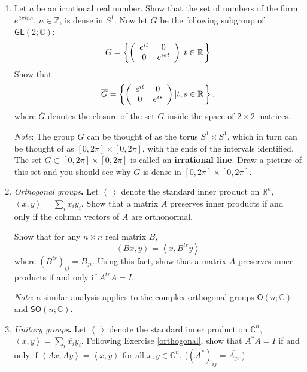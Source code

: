 \documentclass[12pt]{amsbook}
\theoremstyle{plain}
\numberwithin{equation}{chapter}
\numberwithin{theorem}{chapter}
\begin{document}
\begin{enumerate}
\item \label{not.closed}Let $a$ be an irrational real number. Show that the
set of numbers of the form $e^{2\pi ina}$, $n\in\mathbb{Z}$, is dense in
$S^{1}$. Now let $G$ be the following subgroup of $\mathsf{GL}(2;\mathbb{C}%
)$:
\[
G=\left\{  \left(
\begin{array}
[c]{cc}%
e^{it} & 0\\
0 & e^{iat}%
\end{array}
\right)  \left|  t\in\mathbb{R}\right.  \right\}
\]
Show that
\[
\overline{G}=\left\{  \left(
\begin{array}
[c]{cc}%
e^{it} & 0\\
0 & e^{is}%
\end{array}
\right)  \left|  t,s\in\mathbb{R}\right.  \right\}  ,
\]
where $\overline{G}$ denotes the closure of the set $G$ inside the space of
$2\times2$ matrices.

\textit{Note}: The group $\overline{G}$ can be thought of as the torus
$S^{1}\times S^{1}$, which in turn can be thought of as $\left[
0,2\pi\right]  \times\left[  0,2\pi\right]  $, with the ends of the intervals
identified. The set $G\subset\left[  0,2\pi\right]  \times\left[
0,2\pi\right]  $ is called an \textbf{irrational line}. Draw a picture of this
set and you should see why $G$ is dense in $\left[  0,2\pi\right]
\times\left[  0,2\pi\right]  $.

\item \label{orthogonal}\textit{Orthogonal groups}\textbf{.} Let $\left\langle
\ \right\rangle $ denote the standard inner product on $\mathbb{R}^{n}$,
$\left\langle x,y\right\rangle =\sum_{i}x_{i}y_{i}$. Show that a matrix $A$
preserves inner products if and only if the column vectors of $A$ are orthonormal.

Show that for any $n\times n$ real matrix $B$,
\[
\left\langle Bx,y\right\rangle =\left\langle x,B^{tr}y\right\rangle
\]
where $\left(  B^{tr}\right)  _{ij}=B_{ji}$. Using this fact, show that a
matrix $A$ preserves inner products if and only if $A^{tr}A=I$.

\textit{Note}: a similar analysis applies to the complex orthogonal groups
$\mathsf{O}(n;\mathbb{C})$ and $\mathsf{SO}(n;\mathbb{C})$.

\item \label{unitary}\textit{Unitary groups}\textbf{.} Let $\left\langle
\ \right\rangle $ denote the standard inner product on $\mathbb{C}^{n}$,
$\left\langle x,y\right\rangle =\sum_{i}\overline{x_{i}}y_{i}$. Following
Exercise \ref{orthogonal}, show that $A^{\ast}A=I$ if and only if
$\left\langle Ax,Ay\right\rangle =\left\langle x,y\right\rangle $ for all
$x,y\in\mathbb{C}^{n}$. ($\left(  A^{\ast}\right)  _{ij}=\overline{A_{ji}}$.)


\end{enumerate}
\end{document}
